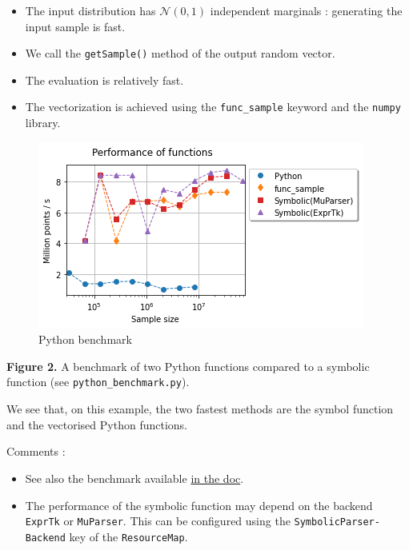 \documentclass[11pt]{article}
\providecommand{\tightlist}{%
      \setlength{\itemsep}{0pt}\setlength{\parskip}{0pt}}
\begin{document}
\begin{itemize}
\tightlist
\item
  The input distribution has \(\mathcal{N}(0,1)\) independent marginals
  : generating the input sample is fast.
\item
  We call the \texttt{getSample()} method of the output random vector.
\item
  The evaluation is relatively fast.
\item
  The vectorization is achieved using the \texttt{func\_sample} keyword
  and the \texttt{numpy} library.
\end{itemize}

    \begin{figure}
\centering
\includegraphics{wrapper-python-benchmark.png}
\caption{Python benchmark}
\end{figure}

\textbf{Figure 2.} A benchmark of two Python functions compared to a symbolic
function (see \texttt{python\_benchmark.py}).

We see that, on this example, the two fastest methods are the symbol
function and the vectorised Python functions.

    Comments :

\begin{itemize}
\item
  See also the benchmark available
  \href{https://openturns.github.io/openturns/latest/developer_guide/wrapper_development.html\#performance-considerations}{in
  the doc}.
\item
  The performance of the symbolic function may depend on the backend
  \texttt{ExprTk} or \texttt{MuParser}. This can be configured using the
  \texttt{SymbolicParser-Backend} key of the \texttt{ResourceMap}.
\end{itemize}
\end{document}
